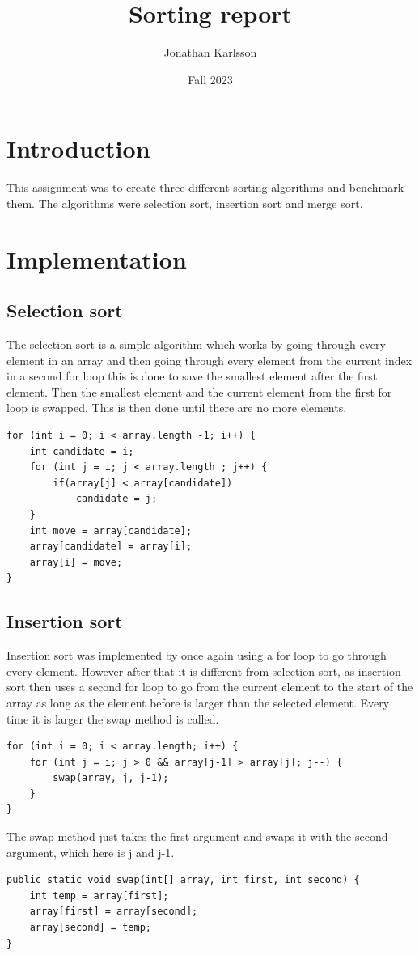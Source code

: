 \documentclass[a4paper,11pt]{article}
\begin{document}
\title{
    \textbf{Sorting report}
}
\author{Jonathan Karlsson}
\date{Fall 2023}

\maketitle

\section*{Introduction}
This assignment was to create three different sorting algorithms and benchmark them. The algorithms were
selection sort, insertion sort and merge sort. 


\section*{Implementation}
\subsection*{Selection sort}
The selection sort is a simple algorithm which works by going through every element in an array and then going through every 
element from the current index in a second for loop this is done to save the smallest element after the first element. Then the smallest element and
the current element from the first for loop is swapped. This is then done until there are no more elements.
\begin{verbatim}
for (int i = 0; i < array.length -1; i++) {
    int candidate = i;
    for (int j = i; j < array.length ; j++) {
        if(array[j] < array[candidate])
            candidate = j; 
    }
    int move = array[candidate];
    array[candidate] = array[i];
    array[i] = move;
}
\end{verbatim}

\subsection*{Insertion sort}
Insertion sort was implemented by once again using a for loop to go through every element. However after that it is different from selection sort,
as insertion sort then uses a second for loop to go from the current element to the start of the array as long as the element before is larger than the 
selected element. Every time it is larger the swap method is called. 
\begin{verbatim}
for (int i = 0; i < array.length; i++) {
    for (int j = i; j > 0 && array[j-1] > array[j]; j--) {
        swap(array, j, j-1);
    }
}
\end{verbatim}
The swap method just takes the first argument and swaps it with the second argument, which here is j and j-1.
\begin{verbatim}
public static void swap(int[] array, int first, int second) {
    int temp = array[first];
    array[first] = array[second];
    array[second] = temp;
}
\end{verbatim}
\end{document}
